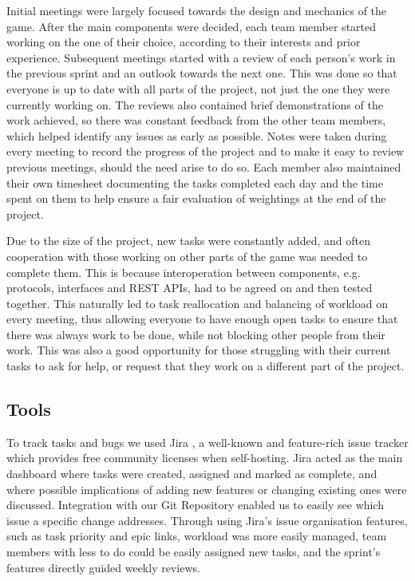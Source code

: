 \documentclass[a4paper,11pt]{article}
\begin{document}
Initial meetings were largely focused towards the design and mechanics of the game. After the main components were decided, each team member started working on the one of their choice, according to their interests and prior experience. Subsequent meetings started with a review of each person’s work in the previous sprint and an outlook towards the next one. This was done so that everyone is up to date with all parts of the project, not just the one they were currently working on. The reviews also contained brief demonstrations of the work achieved, so there was constant feedback from the other team members, which helped identify any issues as early as possible. Notes were taken during every meeting to record the progress of the project and to make it easy to review previous meetings, should the need arise to do so. Each member also maintained their own timesheet documenting the tasks completed each day and the time spent on them to help ensure a fair evaluation of weightings at the end of the project.

Due to the size of the project, new tasks were constantly added, and often cooperation with those working on other parts of the game was needed to complete them. This is because interoperation between components, e.g. protocols, interfaces and REST APIs, had to be agreed on and then tested together. This naturally led to task reallocation and balancing of workload on every meeting, thus allowing everyone to have enough open tasks to ensure that there was always work to be done, while not blocking other people from their work. This was also a good opportunity for those struggling with their current tasks to ask for help, or request that they work on a different part of the project.

\subsection{Tools}

To track tasks and bugs we used Jira \cite{jira}, a well-known and feature-rich issue tracker which provides free community licenses when self-hosting. Jira acted as the main dashboard where tasks were created, assigned and marked as complete, and where possible implications of adding new features or changing existing ones were discussed. Integration with our Git Repository enabled us to easily see which issue a specific change addresses. Through using Jira’s issue organisation features, such as task priority and epic links, workload was more easily managed, team members with less to do could be easily assigned new tasks, and the sprint’s features directly guided weekly reviews.
\end{document}
